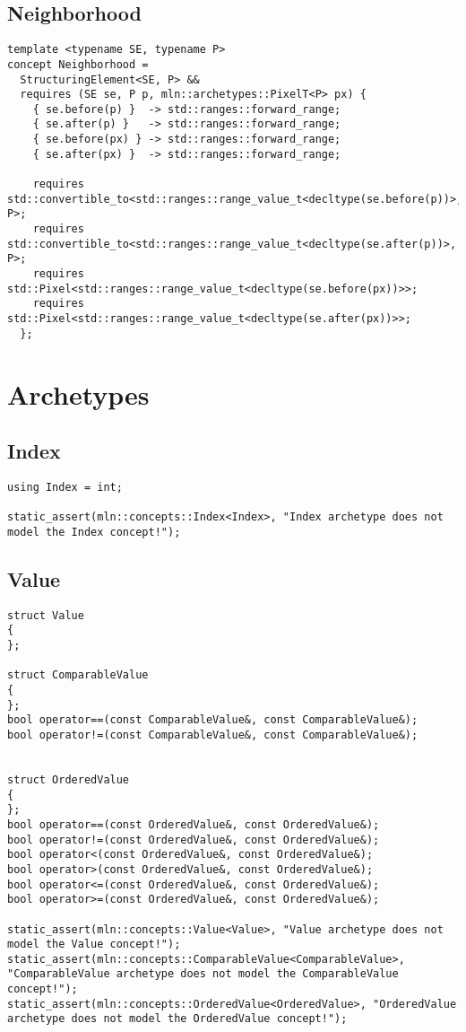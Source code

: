 \subsection{Neighborhood}

\begin{verbatim}
template <typename SE, typename P>
concept Neighborhood =
  StructuringElement<SE, P> &&
  requires (SE se, P p, mln::archetypes::PixelT<P> px) {
    { se.before(p) }  -> std::ranges::forward_range;
    { se.after(p) }   -> std::ranges::forward_range;
    { se.before(px) } -> std::ranges::forward_range;
    { se.after(px) }  -> std::ranges::forward_range;

    requires std::convertible_to<std::ranges::range_value_t<decltype(se.before(p))>, P>;
    requires std::convertible_to<std::ranges::range_value_t<decltype(se.after(p))>, P>;
    requires std::Pixel<std::ranges::range_value_t<decltype(se.before(px))>>;
    requires std::Pixel<std::ranges::range_value_t<decltype(se.after(px))>>;
  };
\end{verbatim}


\section{Archetypes}

\subsection{Index}

\begin{verbatim}
using Index = int;

static_assert(mln::concepts::Index<Index>, "Index archetype does not model the Index concept!");
\end{verbatim}


\subsection{Value}

\begin{verbatim}
struct Value
{
};

struct ComparableValue
{
};
bool operator==(const ComparableValue&, const ComparableValue&);
bool operator!=(const ComparableValue&, const ComparableValue&);


struct OrderedValue
{
};
bool operator==(const OrderedValue&, const OrderedValue&);
bool operator!=(const OrderedValue&, const OrderedValue&);
bool operator<(const OrderedValue&, const OrderedValue&);
bool operator>(const OrderedValue&, const OrderedValue&);
bool operator<=(const OrderedValue&, const OrderedValue&);
bool operator>=(const OrderedValue&, const OrderedValue&);

static_assert(mln::concepts::Value<Value>, "Value archetype does not model the Value concept!");
static_assert(mln::concepts::ComparableValue<ComparableValue>, "ComparableValue archetype does not model the ComparableValue concept!");
static_assert(mln::concepts::OrderedValue<OrderedValue>, "OrderedValue archetype does not model the OrderedValue concept!");
\end{verbatim}


